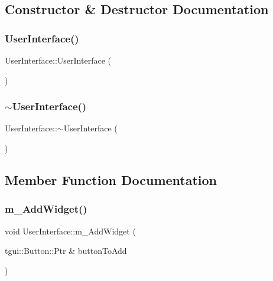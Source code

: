 \subsection{Constructor \& Destructor Documentation}
\mbox{\label{class_user_interface_ae6fb70370701b3bd6120e923df9705b0}} 
\subsubsection{\texorpdfstring{User\+Interface()}{UserInterface()}}
{\footnotesize\ttfamily User\+Interface\+::\+User\+Interface (\begin{DoxyParamCaption}{ }\end{DoxyParamCaption})}

\mbox{\label{class_user_interface_ae588b2ff1711a016dd4c6fc5002c0841}} 
\subsubsection{\texorpdfstring{$\sim$\+User\+Interface()}{~UserInterface()}}
{\footnotesize\ttfamily User\+Interface\+::$\sim$\+User\+Interface (\begin{DoxyParamCaption}{ }\end{DoxyParamCaption})}



\subsection{Member Function Documentation}
\mbox{\label{class_user_interface_a1cdc40b14c55a33279595ccd870051ca}} 
\subsubsection{\texorpdfstring{m\+\_\+\+Add\+Widget()}{m\_AddWidget()}\hspace{0.1cm}{\footnotesize\ttfamily [1/2]}}
{\footnotesize\ttfamily void User\+Interface\+::m\+\_\+\+Add\+Widget (\begin{DoxyParamCaption}\item[{tgui\+::\+Button\+::\+Ptr \&}]{button\+To\+Add }\end{DoxyParamCaption})}

